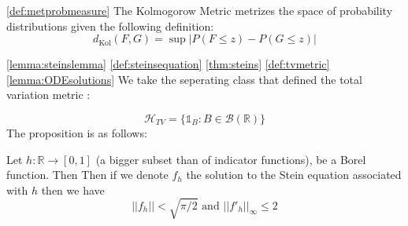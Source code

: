 \begin{definition}
  \label{def:kolmetric}
  \ref{def:metprobmeasure}
  The Kolmogorow Metric metrizes the space of probability distributions given the following definition: 
  \[
    d_{\operatorname{Kol}}(F,G) = \sup | P(F \le z) - P(G\le z) |
  \]
\end{definition}

\begin{lemma}
  \label{lemma:propertiesoffh}
  \ref{lemma:steinslemma}
  \ref{def:steinsequation}
  \ref{thm:steins}
  \ref{def:tvmetric}
  \ref{lemma:ODEsolutions}
   We take the seperating class that defined the total variation metric : 

   \[
   \mathcal{H}_{TV} = \{\mathbb{1}_B : B \in \mathcal{B}(\mathbb{R})\}
   \]
   The proposition is as follows: 

   Let $h : \mathbb{R} \to [0,1]$ (a bigger subset than of indicator functions), be a Borel function. Then 
Then if we denote $f_h$ the solution to the Stein equation associated with $h$ then we have 
\[
  ||f_h||< \sqrt{\pi/2} \text{ and } ||f'_h||_\infty \le 2
\]

\end{lemma}


